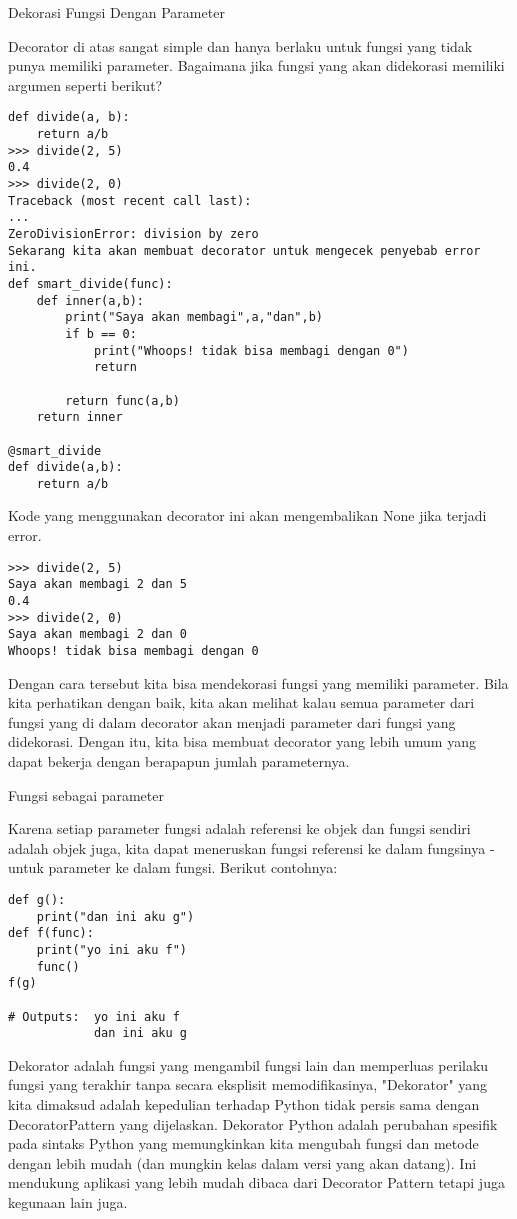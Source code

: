 \documentclass[12pt,a4paper]{article}
\begin{document}
Dekorasi Fungsi Dengan Parameter

Decorator di atas sangat simple dan hanya berlaku untuk fungsi yang tidak punya memiliki parameter. Bagaimana jika fungsi yang akan didekorasi memiliki argumen seperti berikut?
\begin{verbatim}
def divide(a, b):
    return a/b
>>> divide(2, 5)
0.4
>>> divide(2, 0)
Traceback (most recent call last):
...
ZeroDivisionError: division by zero
Sekarang kita akan membuat decorator untuk mengecek penyebab error ini.
def smart_divide(func):
    def inner(a,b):
        print("Saya akan membagi",a,"dan",b)
        if b == 0:
            print("Whoops! tidak bisa membagi dengan 0")
            return

        return func(a,b)
    return inner

@smart_divide
def divide(a,b):
    return a/b
\end{verbatim}

Kode yang menggunakan decorator ini akan mengembalikan None jika terjadi error.
\begin{verbatim}
>>> divide(2, 5)
Saya akan membagi 2 dan 5
0.4
>>> divide(2, 0)
Saya akan membagi 2 dan 0
Whoops! tidak bisa membagi dengan 0
\end{verbatim}

Dengan cara tersebut kita bisa mendekorasi fungsi yang memiliki parameter.
Bila kita perhatikan dengan baik, kita akan melihat kalau semua parameter dari fungsi yang di dalam decorator akan menjadi parameter dari fungsi yang didekorasi. Dengan itu, kita bisa membuat decorator yang lebih umum yang dapat bekerja dengan berapapun jumlah parameternya.

Fungsi sebagai parameter

Karena setiap parameter fungsi adalah referensi ke objek dan fungsi sendiri adalah objek juga, kita dapat meneruskan fungsi referensi ke dalam fungsinya - untuk parameter ke dalam fungsi.
Berikut contohnya: 
\begin{verbatim}
def g():
    print("dan ini aku g")
def f(func):
    print("yo ini aku f")
    func() 
f(g)

# Outputs: 	yo ini aku f
			dan ini aku g
\end{verbatim}


Dekorator adalah fungsi yang mengambil fungsi lain dan memperluas perilaku fungsi yang terakhir tanpa secara eksplisit memodifikasinya, "Dekorator" yang kita dimaksud adalah kepedulian terhadap Python tidak persis sama dengan DecoratorPattern yang dijelaskan. Dekorator Python adalah perubahan spesifik pada sintaks Python yang memungkinkan kita mengubah fungsi dan metode dengan lebih mudah (dan mungkin kelas dalam versi yang akan datang). Ini mendukung aplikasi yang lebih mudah dibaca dari Decorator Pattern tetapi juga kegunaan lain juga.
\end{document}

